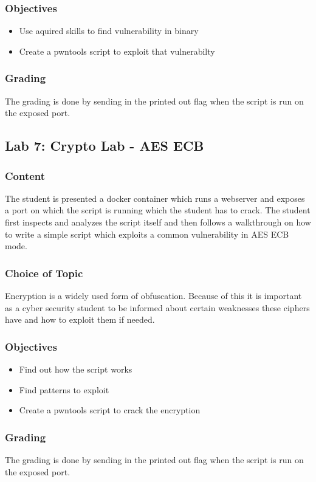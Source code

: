 \subsubsection*{Objectives}
\begin{itemize}
    \item Use aquired skills to find vulnerability in binary
    \item Create a pwntools script to exploit that vulnerabilty
\end{itemize}
\subsubsection*{Grading}
The grading is done by sending in the printed out flag when the script is run on the exposed port.

\subsection{Lab 7: Crypto Lab - AES ECB}
\subsubsection*{Content}
The student is presented a docker container which runs a webserver and exposes a port on which the script is running which the student has to crack. The student first inspects and analyzes the script itself and then follows a walkthrough on how to write a simple script which exploits a common vulnerability in AES ECB mode. 
\subsubsection*{Choice of Topic}
Encryption is a widely used form of obfuscation. Because of this it is important as a cyber security student to be informed about certain weaknesses these ciphers have and how to exploit them if needed. 
\subsubsection*{Objectives}
\begin{itemize}
    \item Find out how the script works
    \item Find patterns to exploit
    \item Create a pwntools script to crack the encryption
\end{itemize}
\subsubsection*{Grading}
The grading is done by sending in the printed out flag when the script is run on the exposed port.
